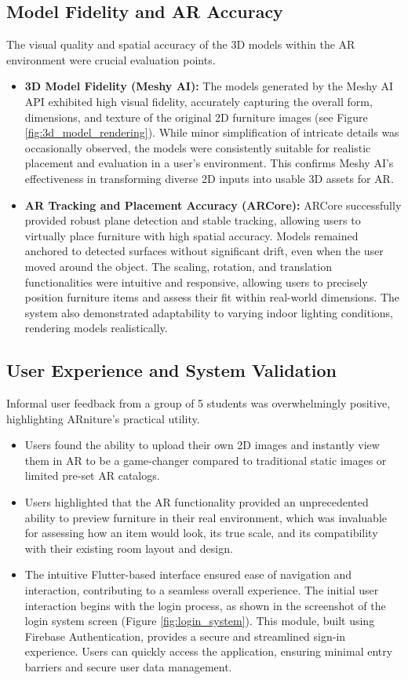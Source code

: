 \documentclass[12pt, a4paper]{article}
\begin{document}
\subsection{Model Fidelity and AR Accuracy}
The visual quality and spatial accuracy of the 3D models within the AR environment were crucial evaluation points.
\begin{itemize}
    \item \textbf{3D Model Fidelity (Meshy AI):} The models generated by the Meshy AI API exhibited high visual fidelity, accurately capturing the overall form, dimensions, and texture of the original 2D furniture images (see Figure \ref{fig:3d_model_rendering}). While minor simplification of intricate details was occasionally observed, the models were consistently suitable for realistic placement and evaluation in a user's environment. This confirms Meshy AI's effectiveness in transforming diverse 2D inputs into usable 3D assets for AR.
    \item \textbf{AR Tracking and Placement Accuracy (ARCore):} ARCore successfully provided robust plane detection and stable tracking, allowing users to virtually place furniture with high spatial accuracy. Models remained anchored to detected surfaces without significant drift, even when the user moved around the object. The scaling, rotation, and translation functionalities were intuitive and responsive, allowing users to precisely position furniture items and assess their fit within real-world dimensions. The system also demonstrated adaptability to varying indoor lighting conditions, rendering models realistically.
\end{itemize}

\subsection{User Experience and System Validation}
Informal user feedback from a group of 5 students was overwhelmingly positive, highlighting ARniture's practical utility.
\begin{itemize}
    \item Users found the ability to upload their own 2D images and instantly view them in AR to be a game-changer compared to traditional static images or limited pre-set AR catalogs.
    \item Users highlighted that the AR functionality provided an unprecedented ability to preview furniture in their real environment, which was invaluable for assessing how an item would look, its true scale, and its compatibility with their existing room layout and design.
    \item The intuitive Flutter-based interface ensured ease of navigation and interaction, contributing to a seamless overall experience. The initial user interaction begins with the login process, as shown in the screenshot of the login system screen (Figure \ref{fig:login_system}). This module, built using Firebase Authentication, provides a secure and streamlined sign-in experience. Users can quickly access the application, ensuring minimal entry barriers and secure user data management.
\end{itemize}
\end{document}
